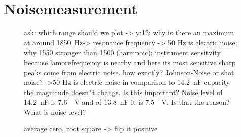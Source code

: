 \section{Noisemeasurement}
\label{sec:Noisemeasurement}



\begin{figure}[H]
    \centering
    
    \caption[]{ask: which range should we plot -> y:12; \newline
    why is there an maximum at around \SI{1850}{Hz}-> resonance frequency -> 50 Hz is electric noise; why 1550 stronger than 1500 (harmnoic): instrument sensitvity because lamorefrequency is nearby and here its most sensitive\newline
    sharp peaks come from electric noise. how exactly? Johnson-Noise or shot noise? ->50 Hz is electric noise\newline
    in comparison to \SI{14.2}{\nano \farad} capacity the magnitude doesn´t change. Is this important? 
    \newline
    Noise level of \SI{14.2}{\nano \farad} is \SI{7.6}{\mu \volt} and of \SI{13.8}{\nano \farad} it is \SI{7.5}{\mu \volt}. Is that the reason?\newline
    What is noise level?}
    \label{fig:MonitorNoise138}
\end{figure}

\begin{figure}[H]
    \centering
    
    \caption[]{average cero, root square -> flip it positive}
    \label{fig:noise}
\end{figure}